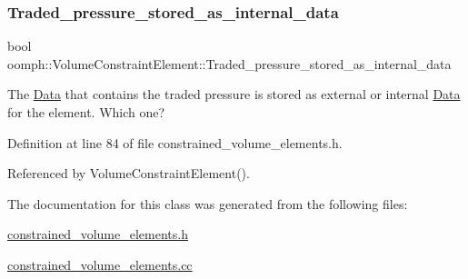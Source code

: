 \subsubsection{\texorpdfstring{Traded\+\_\+pressure\+\_\+stored\+\_\+as\+\_\+internal\+\_\+data}{Traded\_pressure\_stored\_as\_internal\_data}}
{\footnotesize\ttfamily bool oomph\+::\+Volume\+Constraint\+Element\+::\+Traded\+\_\+pressure\+\_\+stored\+\_\+as\+\_\+internal\+\_\+data\hspace{0.3cm}{\ttfamily [private]}}



The \hyperlink{classoomph_1_1Data}{Data} that contains the traded pressure is stored as external or internal \hyperlink{classoomph_1_1Data}{Data} for the element. Which one? 



Definition at line 84 of file constrained\+\_\+volume\+\_\+elements.\+h.



Referenced by Volume\+Constraint\+Element().



The documentation for this class was generated from the following files\+:\begin{DoxyCompactItemize}
\item 
\hyperlink{constrained__volume__elements_8h}{constrained\+\_\+volume\+\_\+elements.\+h}\item 
\hyperlink{constrained__volume__elements_8cc}{constrained\+\_\+volume\+\_\+elements.\+cc}\end{DoxyCompactItemize}
